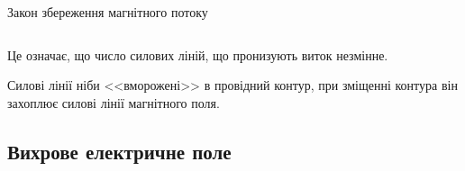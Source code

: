 \documentclass[onlytextwidth]{beamer}
\begin{document}
\begin{frame}{Закон збереження магнітного потоку}{}
\begin{columns}
\begin{column}{0.8\linewidth}
\begin{block}{}
			\end{block}
		\end{column}
	\end{columns}
	\begin{block}{}\justifying
		Це означає, що \alert{число силових ліній, що пронизують виток незмінне}.

		\smallskip

		Силові лінії ніби <<вморожені>> в провідний контур, при зміщенні контура він захоплює силові лінії магнітного поля.
	\end{block}
\end{frame}




\subsection{Вихрове електричне поле}
\end{document}
